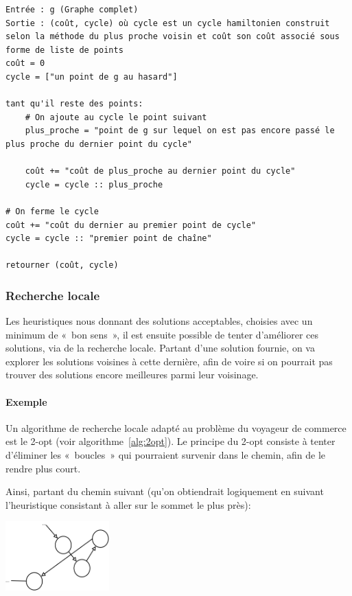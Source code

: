     \begin{lstlisting}
Entrée : g (Graphe complet)
Sortie : (coût, cycle) où cycle est un cycle hamiltonien construit selon la méthode du plus proche voisin et coût son coût associé sous forme de liste de points
coût = 0
cycle = ["un point de g au hasard"]

tant qu'il reste des points:
    # On ajoute au cycle le point suivant
    plus_proche = "point de g sur lequel on est pas encore passé le plus proche du dernier point du cycle"

    coût += "coût de plus_proche au dernier point du cycle"
    cycle = cycle :: plus_proche

# On ferme le cycle
coût += "coût du dernier au premier point de cycle"
cycle = cycle :: "premier point de chaîne"

retourner (coût, cycle)
    \end{lstlisting}

  \subsubsection{Recherche locale}
    Les heuristiques nous donnant des solutions acceptables, choisies avec un
    minimum de «~bon sens~», il est ensuite possible de tenter d'améliorer
    ces solutions, via de la recherche locale.
    Partant d'une solution fournie, on va explorer les solutions voisines
    à cette dernière, afin de voire si on pourrait pas trouver des solutions
    encore meilleures parmi leur voisinage.

    \paragraph{Exemple} Un algorithme de recherche locale adapté au problème
    du voyageur de commerce est le 2-opt (voir algorithme~\ref{alg:2opt}).
    Le principe du 2-opt consiste à tenter d'éliminer les «~boucles~» qui
    pourraient survenir dans le chemin, afin de le rendre plus court.

    Ainsi, partant du chemin suivant (qu'on obtiendrait logiquement en suivant
    l'heuristique consistant à aller sur le sommet le plus près):

    \begin{center}
    \includegraphics[width=0.3\textwidth]{graphes/2opt1.png}
    \end{center}

